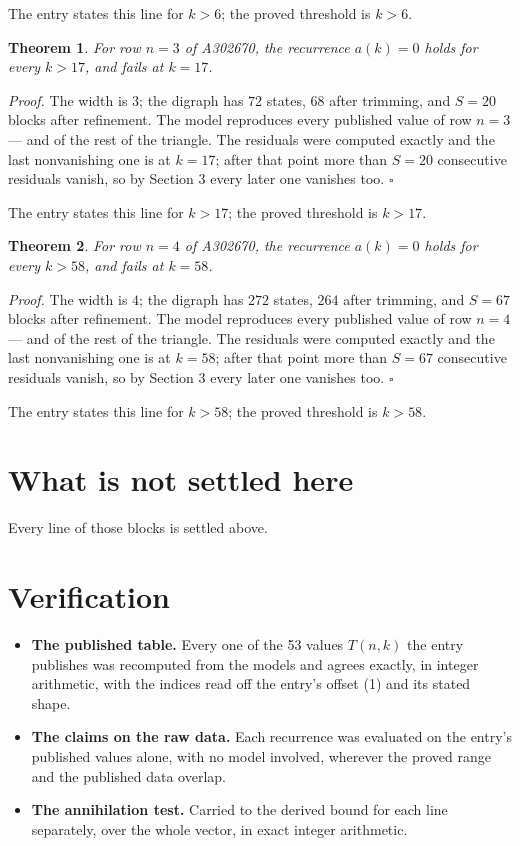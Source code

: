 \documentclass[11pt]{article}
\newtheorem{theorem}{Theorem}
\theoremstyle{definition}
\begin{document}
The entry states this line for $k > 6$; the proved threshold is $k > 6$.

\begin{theorem} For row $n = 3$ of A302670, the recurrence $a(k) = 0$ holds for every $k > 17$, and fails at $k = 17$.\end{theorem}

{\itshape Proof.} The width is $3$; the digraph has $72$ states, $68$ after trimming, and $S = 20$ blocks after refinement. The model reproduces every published value of row $n = 3$ --- and of the rest of the triangle. The residuals were computed exactly and the last nonvanishing one is at $k = 17$; after that point more than $S = 20$ consecutive residuals vanish, so by Section 3 every later one vanishes too. $\square$

The entry states this line for $k > 17$; the proved threshold is $k > 17$.

\begin{theorem} For row $n = 4$ of A302670, the recurrence $a(k) = 0$ holds for every $k > 58$, and fails at $k = 58$.\end{theorem}

{\itshape Proof.} The width is $4$; the digraph has $272$ states, $264$ after trimming, and $S = 67$ blocks after refinement. The model reproduces every published value of row $n = 4$ --- and of the rest of the triangle. The residuals were computed exactly and the last nonvanishing one is at $k = 58$; after that point more than $S = 67$ consecutive residuals vanish, so by Section 3 every later one vanishes too. $\square$

The entry states this line for $k > 58$; the proved threshold is $k > 58$.

\section{What is not settled here}

Every line of those blocks is settled above.

\section{Verification}

\begin{itemize}

\item {\bfseries The published table.} Every one of the 53 values $T(n,k)$ the entry publishes was recomputed from the models and agrees exactly, in integer arithmetic, with the indices read off the entry's offset (1) and its stated shape.

\item {\bfseries The claims on the raw data.} Each recurrence was evaluated on the entry's published values alone, with no model involved, wherever the proved range and the published data overlap.

\item {\bfseries The annihilation test.} Carried to the derived bound for each line separately, over the whole vector, in exact integer arithmetic.

\end{itemize}
\end{document}
